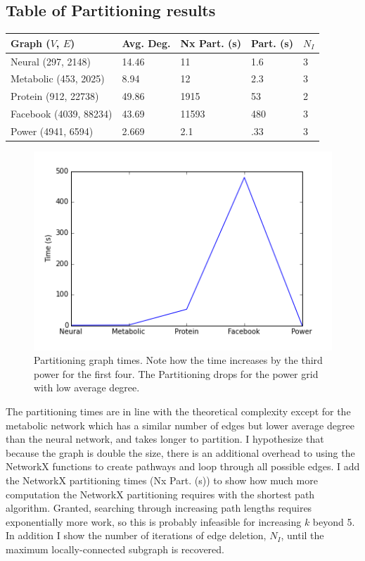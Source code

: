 \documentclass{article}
\begin{document}
\subsection{Table of Partitioning results} 
\begin{spacing}{1}
\begin{center}
\renewcommand{\arraystretch}{1.5}
    \begin{tabular}{| l | l | l | l | l |}
    \hline
    Graph ($V$, $E$) & Avg. Deg. & Nx Part. (s) & Part. (s) & $N_I$ \\ \hline
    Neural (297, 2148) & 14.46 & 11 & 1.6 & 3 \\ \hline
    Metabolic (453, 2025) & 8.94 & 12 & 2.3 & 3 \\  \hline
    Protein (912, 22738) & 49.86 & 1915 & 53 & 2 \\ \hline
    Facebook (4039, 88234) & 43.69 & 11593 & 480 & 3 \\ \hline
    Power (4941, 6594) & 2.669 & 2.1 & .33 & 3 \\ 
    \hline
    \end{tabular}
\end{center}
\end{spacing}

\begin{figure}[H]
\centering
\includegraphics[width = \linewidth]{ptimes.png}
\caption{Partitioning graph times. Note how the time increases by the third power for the first four. The Partitioning drops for the power grid with low average degree.}
\end{figure}

The partitioning times are in line with the theoretical complexity except for the metabolic network which has a similar number of edges but lower average degree than the neural network, and takes longer to partition. I hypothesize that because the graph is double the size, there is an additional overhead to using the NetworkX functions to create pathways and loop through all possible edges. I add the NetworkX partitioning times (Nx Part. (s)) to show how much more computation the NetworkX partitioning requires with the shortest path algorithm. Granted, searching through increasing path lengths requires exponentially more work, so this is probably infeasible for increasing $k$ beyond 5. In addition I show the number of iterations of edge deletion, $N_I$, until the maximum locally-connected subgraph is recovered.
\end{document}
